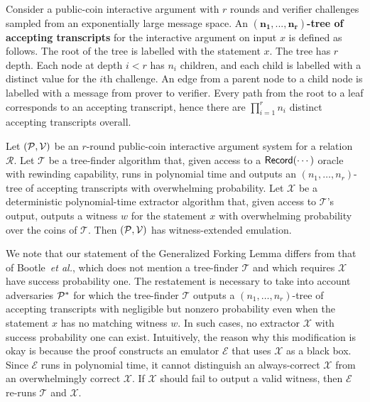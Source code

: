Consider a public-coin interactive argument with $r$ rounds and verifier challenges sampled from an exponentially large message space. An \textbf{$\mathbf{(n_1,...,n_r)}$-tree of accepting transcripts} for the interactive argument on input $x$ is defined as follows. The root of the tree is labelled with the statement $x$. The tree has $r$ depth. Each node at depth $i < r$ has $n_i$ children, and each child is labelled with a distinct value for the $i$th challenge. An edge from a parent node to a child node is labelled with a message from prover to verifier. Every path from the root to a leaf corresponds to an accepting transcript, hence there are $\prod_{i=1}^r n_i$ distinct accepting transcripts overall. 

\begin{lemma} \label{lemma:GFL}
Let $(\mathcal{P}, \mathcal{V})$ be an $r$-round public-coin interactive argument system for a relation $\mathcal{R}$. Let $\mathcal{T}$ be a tree-finder algorithm that, given access to a $\textsf{{Record}}(\cdots)$ oracle with rewinding capability, runs in polynomial time and outputs an $({n_1}, \ldots, {n_r})$-tree of accepting transcripts with overwhelming probability. Let $\mathcal{X}$ be a deterministic polynomial-time extractor algorithm that, given access to $\mathcal{T}$'s output, outputs a witness $w$ for the statement $x$ with overwhelming probability over the coins of $\mathcal{T}$. Then $(\mathcal{P}, \mathcal{V})$ has witness-extended emulation.
\end{lemma}

We note that our statement of the Generalized Forking Lemma differs from that of Bootle~\emph{et al.}, which does not mention a tree-finder $\mathcal{T}$ and which requires $\mathcal{X}$ have success probability one. The restatement is necessary to take into account adversaries $\mathcal{P}^*$ for which the tree-finder $\mathcal{T}$ outputs a $({n_1}, \ldots, {n_r})$-tree of accepting transcripts with negligible but nonzero probability even when the statement $x$ has no matching witness $w$. In such cases, no extractor $\mathcal{X}$ with success probability one can exist. Intuitively, the reason why this modification is okay is because the proof constructs an emulator $\mathcal{E}$ that uses $\mathcal{X}$ as a black box. Since $\mathcal{E}$ runs in polynomial time, it cannot distinguish an always-correct $\mathcal{X}$ from an overwhelmingly correct $\mathcal{X}$. If $\mathcal{X}$ should fail to output a valid witness, then $\mathcal{E}$ re-runs $\mathcal{T}$ and $\mathcal{X}$.


